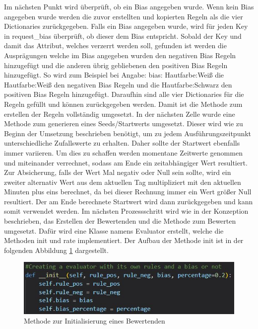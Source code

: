 \begin{onehalfspace}
Im nächsten Punkt wird überprüft, ob ein Bias angegeben wurde. Wenn kein Bias angegeben wurde werden die zuvor erstellten und kopierten Regeln als die vier Dictionaries zurückgegeben. Falls ein Bias angegeben wurde, wird für jeden Key in \glqq{}request\_bias\grqq{} überprüft, ob dieser dem Bias entspricht. Sobald der Key und damit das Attribut, welches verzerrt werden soll, gefunden ist werden die Ausprägungen welche im Bias angegeben wurden den negativen Bias Regeln hinzugefügt und die anderen übrig gebliebenen den positiven Bias Regeln hinzugefügt. So wird zum Beispiel bei Angabe: \glqq{}bias: Hautfarbe:Weiß\grqq{} die Hautfarbe:Weiß den negativen Bias Regeln und die Hautfarbe:Schwarz den positiven Bias Regeln hinzugefügt. Daraufhin sind alle vier Dictionaries für die Regeln gefüllt und können zurückgegeben werden.
Damit ist die Methode zum erstellen der Regeln vollständig umgesetzt.
In der nächsten Zelle wurde eine Methode zum generieren eines Seeds/Startwerts umgesetzt. Dieser wird wie zu Beginn der Umsetzung beschrieben benötigt, um zu jedem Ausführungszeitpunkt unterschiedliche Zufallswerte zu erhalten. Daher sollte der Startwert ebenfalls immer variieren. Um dies zu schaffen werden momentane Zeitwerte genommen und miteinander verrechnet, sodass am Ende ein zeitabhängiger Wert resultiert. Zur Absicherung, falls der Wert Mal negativ oder Null sein sollte, wird ein zweiter alternativ Wert aus dem aktuellen Tag multipliziert mit den aktuellen Minuten plus eins berechnet, da bei dieser Rechnung immer ein Wert größer Null resultiert. Der am Ende berechnete Startwert wird dann zurückgegeben und kann somit verwendet werden.    
Im nächsten Prozessschritt wird wie in der Konzeption beschrieben, das Erstellen der Bewertenden und die Methode zum Bewerten umgesetzt. Dafür wird eine Klasse namens \glqq{}Evaluator\grqq{} erstellt, welche die Methoden \glqq{}init\grqq{} und \glqq{}rate\grqq{} implementiert. Der Aufbau der Methode \glqq{}init\grqq{} ist in der folgenden Abbildung \ref{fig:Evaluator_init} dargestellt.
\begin{figure}[h]
    \centering
    \includegraphics{Diagramme/Evaluator_Init.JPG}
    \caption{Methode zur Initialisierung eines Bewertenden}
    \label{fig:Evaluator_init}

\end{figure}
\end{onehalfspace}
